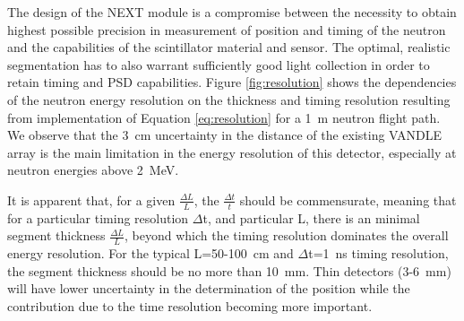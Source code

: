 \documentclass[preprint,3p,twocolumn]{elsarticle}
\begin{document}
The design of the NEXT module is a compromise between the necessity to obtain highest possible precision in measurement of position and timing of the neutron and the capabilities of the scintillator material and sensor. The optimal, realistic segmentation has to also warrant sufficiently good light collection in order to retain timing and PSD capabilities. Figure \ref{fig:resolution} shows the dependencies of the  neutron energy resolution on the thickness and timing resolution resulting from implementation of Equation \ref{eq:resolution} for a 1~m neutron flight path. We observe that the 3~cm uncertainty in the distance of the existing VANDLE \cite{PETERS2016122} array is the main limitation in the energy resolution of this detector, especially at neutron energies above 2~MeV.

It is apparent that, for a given $\frac{\Delta L}{L}$, the $\frac{\Delta t}{t}$  should be commensurate, meaning that for a particular timing resolution $\Delta$t, and particular L, there is an minimal segment thickness $\frac{\Delta L}{L}$, beyond which the timing resolution dominates the overall energy resolution. For the typical L=50-100~cm and $\Delta$t=1~ns  timing resolution, the segment thickness should be no more than 10~mm. Thin detectors (3-6~mm) will have lower uncertainty in the determination of the position while the contribution due to the time resolution becoming more important.
\end{document}
